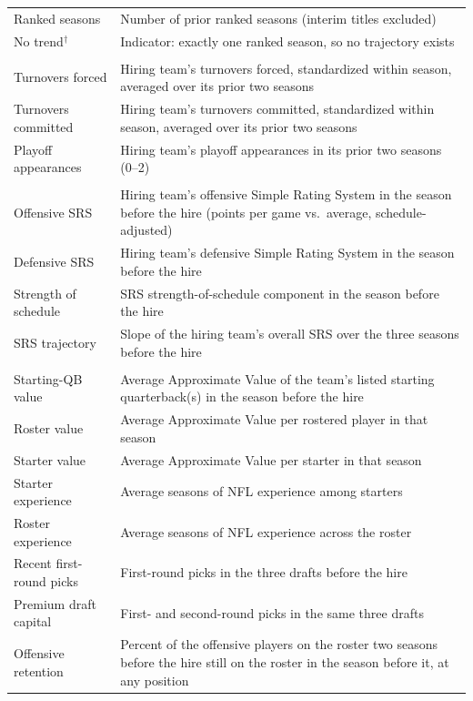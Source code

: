 \documentclass[12pt,USenglish]{article}
\begin{document}
{\begin{longtable}{@{}l p{8.8cm}@{}}
Ranked seasons & Number of prior ranked seasons (interim titles excluded) \\
No trend$^{\dagger}$ & Indicator: exactly one ranked season, so no trajectory exists \\
\addlinespace
\multicolumn{2}{@{}l}{\emph{Hiring-team results (3)}}\\[2pt]
Turnovers forced & Hiring team's turnovers forced, standardized within season, averaged over its prior two seasons \\
Turnovers committed & Hiring team's turnovers committed, standardized within season, averaged over its prior two seasons \\
Playoff appearances & Hiring team's playoff appearances in its prior two seasons (0--2) \\
\addlinespace
\multicolumn{2}{@{}l}{\emph{Inherited team quality (4)}}\\[2pt]
Offensive SRS & Hiring team's offensive Simple Rating System in the season before the hire (points per game vs.\ average, schedule-adjusted) \\
Defensive SRS & Hiring team's defensive Simple Rating System in the season before the hire \\
Strength of schedule & SRS strength-of-schedule component in the season before the hire \\
SRS trajectory & Slope of the hiring team's overall SRS over the three seasons before the hire \\
\addlinespace
\multicolumn{2}{@{}l}{\emph{Inherited roster (11)}}\\[2pt]
Starting-QB value & Average Approximate Value of the team's listed starting quarterback(s) in the season before the hire \\
Roster value & Average Approximate Value per rostered player in that season \\
Starter value & Average Approximate Value per starter in that season \\
Starter experience & Average seasons of NFL experience among starters \\
Roster experience & Average seasons of NFL experience across the roster \\
Recent first-round picks & First-round picks in the three drafts before the hire \\
Premium draft capital & First- and second-round picks in the same three drafts \\
Offensive retention & Percent of the offensive players on the roster two seasons before the hire still on the roster in the season before it, at any position \\

\end{longtable}}
\end{document}

